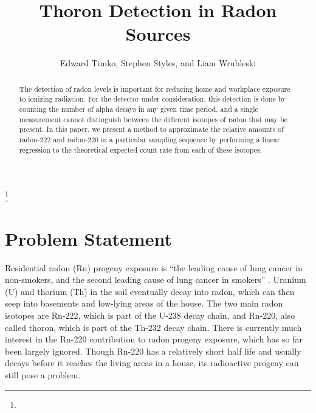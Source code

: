 \documentclass[11pt]{m2pi}
\begin{document}
\title[Thoron Detection]{Thoron Detection in Radon Sources}

 \author{Edward Timko, Stephen Styles, and Liam Wrubleski}
\address{}
\email{}



\thanks{}

\begin{abstract}
    The detection of radon levels is important for reducing home and workplace exposure to ionizing radiation.
    For the detector under consideration, this detection is done by counting the number of alpha decays in any given time period, and a single measurement cannot distinguish between the different isotopes of radon that may be present. 
    In this paper, we present a method to approximate the relative amounts of radon-222 and radon-220 in a particular sampling sequence by performing a linear regression to the theoretical expected count rate from each of these isotopes.
\end{abstract}

\maketitle
\vspace*{-0.75cm}
\section{Problem Statement}\label{S:Intro} %

Residential radon (Rn) progeny exposure is ``the leading cause of lung cancer in non-smokers, and the second leading cause of lung cancer in smokers'' \cite{LungCancerCanada}. Uranium (U) and thorium (Th) in the soil eventually decay into radon, which can then seep into basements and low-lying areas of the house. The two main radon isotopes are Rn-222, which is part of the U-238 decay chain, and Rn-220, also called thoron, which is part of the Th-232 decay chain. There is currently much interest in the Rn-220 contribution to radon progeny exposure, which has so far been largely ignored. Though Rn-220 has a relatively short half life and usually decays before it reaches the living areas in a house, its radioactive progeny can still pose a problem.\\
\end{document}
